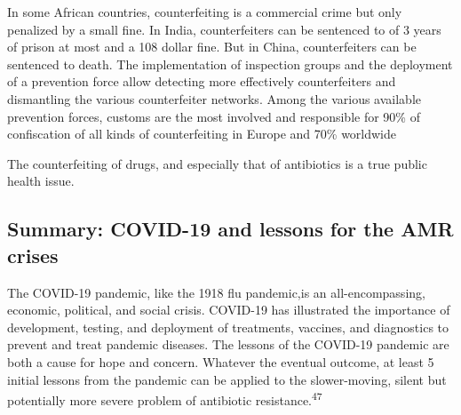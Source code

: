\documentclass[
  11pt,
  paper=a4,
  ,captions=tableheading
]{scrartcl}
\begin{document}
In some African countries, counterfeiting is a commercial crime but only
penalized by a small fine. In India, counterfeiters can be sentenced to
of 3 years of prison at most and a 108 dollar fine. But in China,
counterfeiters can be sentenced to death. The implementation of
inspection groups and the deployment of a prevention force allow
detecting more effectively counterfeiters and dismantling the various
counterfeiter networks. Among the various available prevention forces,
customs are the most involved and responsible for 90\% of confiscation
of all kinds of counterfeiting in Europe and 70\% worldwide

The counterfeiting of drugs, and especially that of antibiotics is a
true public health issue.

\hypertarget{summary-covid-19-and-lessons-for-the-amr-crises}{%
\subsection*{Summary: COVID-19 and lessons for the AMR
crises}\label{summary-covid-19-and-lessons-for-the-amr-crises}}

The COVID-19 pandemic, like the 1918 flu pandemic,is an
all-encompassing, economic, political, and social crisis. COVID-19 has
illustrated the importance of development, testing, and deployment of
treatments, vaccines, and diagnostics to prevent and treat pandemic
diseases. The lessons of the COVID-19 pandemic are both a cause for hope
and concern. Whatever the eventual outcome, at least 5 initial lessons
from the pandemic can be applied to the slower-moving, silent but
potentially more severe problem of antibiotic
resistance.\textsuperscript{47}
\end{document}

